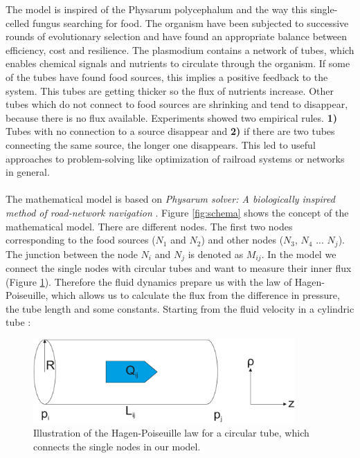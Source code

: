 \documentclass[11pt]{scrartcl}
\begin{document}
The model is inspired of the Physarum polycephalum and the way this single-celled fungus searching for food. The organism have been subjected to successive rounds of evolutionary selection and have found an appropriate balance between efficiency, cost and resilience. The plasmodium contains a network of tubes, which enables chemical signals and nutrients to circulate through the organism. If some of the tubes have found food sources, this implies a positive feedback to the system. This tubes are getting thicker so the flux of nutrients increase. Other tubes which do not connect to food sources are shrinking and tend to disappear, because there is no flux available. Experiments showed two empirical rules. \textbf{1)} Tubes with no connection to a source disappear and \textbf{2)} if there are two tubes connecting the same source, the longer one disappears. This led to useful approaches to problem-solving like optimization of railroad systems or networks in general.~\\
~\\
The mathematical model is based on \textit{Physarum solver: A biologically inspired method of road-network navigation} \cite{network_model}. Figure \ref{fig:schema} shows the concept of the mathematical model. There are different nodes. The first two nodes corresponding to the food sources ($N_1$ and $N_2$) and other nodes ($N_3$, $N_4$ ... $N_j$). The junction between the node $N_i$ and $N_j$ is denoted as $M_{ij}$. In the model we connect the single nodes with circular tubes and want to measure their inner flux (Figure \ref{fig:fluidd}). Therefore the fluid dynamics prepare us with the law of Hagen-Poiseuille, which allows us to calculate the flux from the difference in pressure, the tube length and some constants. Starting from the fluid velocity in a cylindric tube \cite{kirb2010}:
\begin{figure}[H]
	\centering
	\includegraphics[width=10cm]{figures/figure2}
	\caption{Illustration of the Hagen-Poiseuille law for a circular tube, which connects the single nodes in our model.}
	\label{fig:fluidd}
\end{figure}
\end{document}
